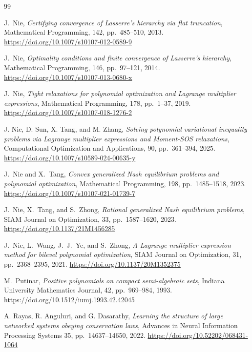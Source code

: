 \documentclass[pdflatex,sn-mathphys-num]{sn-jnl}%
\theoremstyle{thmstyleone}%
\theoremstyle{thmstyletwo}%
\theoremstyle{thmstylethree}%
\begin{document}
\begin{thebibliography}{99}



{\sc J.~Nie},
{\em Certifying convergence of Lasserre’s hierarchy via flat truncation},
Mathematical Programming, 142, pp.~485--510, 2013.
\url{https://doi.org/10.1007/s10107-012-0589-9}

{\sc J.~Nie}, {\em Optimality
	conditions and finite convergence of {L}asserre's hierarchy}, Mathematical
Programming, 146, pp.~97--121, 2014.
\url{https://doi.org/10.1007/s10107-013-0680-x}



{\sc J.~Nie}, {\em Tight relaxations for polynomial optimization and {L}agrange multiplier expressions}, Mathematical Programming, 178, pp.~1--37, 2019.
\url{https://doi.org/10.1007/s10107-018-1276-2}

{\sc J. Nie, D. Sun, X. Tang, and M. Zhang},
{\em Solving polynomial variational inequality problems via Lagrange
multiplier expressions and Moment-SOS relaxations},
Computational Optimization and Applications, 90, pp.~361--394, 2025.
\url{https://doi.org/10.1007/s10589-024-00635-y}

{\sc J.~Nie and X.~Tang}, {\em Convex generalized {N}ash equilibrium problems
	and polynomial optimization}, Mathematical Programming, 198,
pp.~1485--1518, 2023.
\url{https://doi.org/10.1007/s10107-021-01739-7}

{\sc J.~Nie, X.~Tang, and S.~Zhong}, {\em Rational generalized Nash
	equilibrium problems}, SIAM Journal on Optimization, 33, pp.~1587--1620, 2023.
\url{https://doi.org/10.1137/21M1456285}

{\sc J.~Nie, L.~Wang, J.~J.~Ye, and S.~Zhong}, {\em A Lagrange multiplier expression method for bilevel polynomial optimization}, SIAM Journal on Optimization, 31, pp.~2368--2395, 2021.
\url{https://doi.org/10.1137/20M1352375}




{\sc M.~Putinar}, {\em Positive polynomials on compact semi-algebraic sets},
Indiana University Mathematics Journal, 42, pp.~969--984, 1993.
\url{https://doi.org/10.1512/iumj.1993.42.42045}

{\sc A. Rayas, R. Anguluri, and G. Dasarathy},
{\em Learning the structure of large networked systems obeying conservation laws}, Advances in Neural Information Processing Systems 35, pp.~14637--14650, 2022.
\url{https://doi.org/10.52202/068431-1064}


\end{thebibliography}
\end{document}
